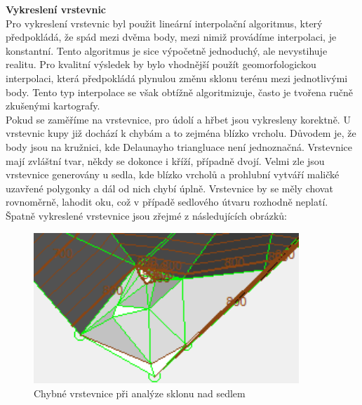 \documentclass[a4paper,11pt,twoside]{article}
\begin{document}
\noindent\textbf{Vykreslení vrstevnic}\\
\noindent Pro vykreslení vrstevnic byl použit lineární interpolační algoritmus, který předpokládá, že spád mezi dvěma body, mezi nimiž provádíme interpolaci, je konstantní. Tento algoritmus je sice výpočetně jednoduchý, ale nevystihuje realitu. Pro kvalitní výsledek by bylo vhodnější použít geomorfologickou interpolaci, která předpokládá plynulou změnu sklonu terénu mezi jednotlivými body. Tento typ interpolace se však obtížně algoritmizuje, často je tvořena ručně zkušenými kartografy.\\
\indent Pokud se zaměříme na vrstevnice, pro údolí a hřbet jsou vykresleny korektně. U vrstevnic kupy již dochází k chybám a to zejména blízko vrcholu. Důvodem je, že body jsou na kružnici, kde Delaunayho triangluace není jednoznačná. Vrstevnice mají zvláštní tvar, někdy se dokonce i kříží, případně dvojí. Velmi zle jsou vrstevnice generovány u sedla, kde blízko vrcholů a prohlubní vytváří maličké uzavřené polygonky a dál od nich chybí úplně. Vrstevnice by se měly chovat rovnoměrně, lahodit oku, což v případě sedlového útvaru rozhodně neplatí.\\
\indent Špatně vykreslené vrstevnice jsou zřejmé z následujících obrázků:\\

\vspace{0.2cm}
\begin{figure}[hbt!] 
\begin{center}
\includegraphics[width=10cm]{pictures/saddle_panchromatic_slope_detail.PNG} 
\caption[Chybné vrstevnice při analýze sklonu nad sedlem]{Chybné vrstevnice při analýze sklonu nad sedlem}
\label{fig:saddle_panchromatic_slope_detail}
\end{center}
\end{figure}
\end{document}
